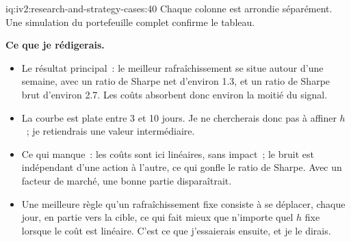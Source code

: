 \begin{solution}{iq:iv2:research-and-strategy-cases:40}
Chaque colonne est arrondie séparément. Une simulation du portefeuille complet confirme le tableau.

\textbf{Ce que je rédigerais.}
\begin{itemize}
\item Le résultat principal~: le meilleur rafraîchissement se situe autour d'une semaine, avec un ratio de Sharpe net d'environ 1.3, et un ratio de Sharpe brut d'environ 2.7. Les coûts absorbent donc environ la moitié du signal.
\item La courbe est plate entre 3 et 10 jours. Je ne chercherais donc pas à affiner $h$~; je retiendrais une valeur intermédiaire.
\item Ce qui manque~: les coûts sont ici linéaires, sans impact~; le bruit est indépendant d'une action à l'autre, ce qui gonfle le ratio de Sharpe. Avec un facteur de marché, une bonne partie disparaîtrait.
\item Une meilleure règle qu'un rafraîchissement fixe consiste à se déplacer, chaque jour, en partie vers la cible, ce qui fait mieux que n'importe quel $h$ fixe lorsque le coût est linéaire. C'est ce que j'essaierais ensuite, et je le dirais.
\end{itemize}

\end{solution}

